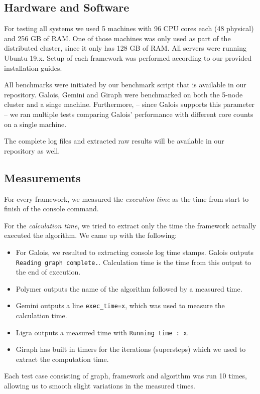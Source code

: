 
\subsection{Hardware and Software}
For testing all systems we used 5 machines with 96 CPU cores each (48 physical) and 256 GB of RAM. One of those machines was only used as part of the distributed cluster, since it only has 128 GB of RAM.
All servers were running Ubuntu 19.x.
Setup of each framework was performed according to our provided installation guides.

All benchmarks were initiated by our benchmark script that is available in our repository. Galois, Gemini and Giraph were benchmarked on both the 5-node cluster and a singe machine.
Furthermore, -- since Galois supports this parameter -- we ran multiple tests comparing Galois' performance with different core counts on a single machine.

The complete log files and extracted raw results will be available in our repository as well.

\subsection{Measurements}
For every framework, we measured the \emph{execution time} as the time from start to finish of the console command.

For the \emph{calculation time}, we tried to extract only the time the framework actually executed the algorithm. We came up with the following:
\begin{itemize}
	\item For Galois, we resulted to extracting console log time stamps. Galois outputs \texttt{Reading graph complete.}. Calculation time is the time from this output to the end of execution.
	\item Polymer outputs the name of the algorithm followed by a measured time.
	\item Gemini outputs a line \texttt{exec\_time=x}, which was used to measure the calculation time. 
	\item Ligra outputs a measured time with \texttt{Running time : x}.
	\item Giraph has built in timers for the iterations (supersteps) which we used to extract the computation time.
\end{itemize}
Each test case consisting of graph, framework and algorithm was run 10 times, allowing us to smooth slight variations in the measured times.

